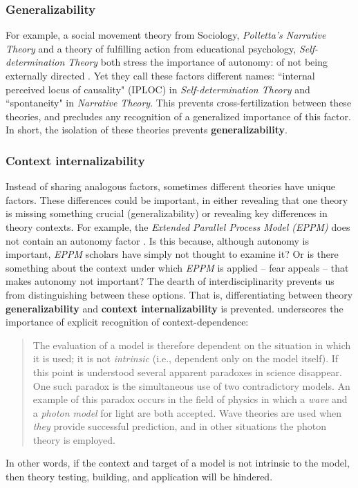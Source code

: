 \documentclass[12 pt]{article}
\begin{document}
 \subsubsection{Generalizability}
  For example, a social movement theory from Sociology, \textit{Polletta's Narrative Theory} and a theory of fulfilling action from educational psychology, \textit{Self-determination Theory} both stress the importance of autonomy: of not being externally directed \parencite{Polletta1998,Ryan2000,Ryan2000a}. Yet they call these factors different names: ``internal perceived locus of causality" (IPLOC) in \textit{Self-determination Theory} \parencite{Ryan2000,Ryan2000a} and ``spontaneity" in \textit{Narrative Theory}. This prevents cross-fertilization between these theories, and precludes any recognition of a generalized importance of this factor.  In short, the isolation of these theories prevents \textbf{generalizability}. 
 
 \subsubsection{Context internalizability} 
  Instead of sharing analogous factors, sometimes different theories have unique factors.  These differences could be important, in either revealing that one theory is missing something crucial (generalizability) or revealing key differences in theory contexts. For example, the \textit{Extended Parallel Process Model (EPPM)} does not contain an autonomy factor \parencite{Maloney2011}. Is this because, although autonomy is important, \textit{EPPM} scholars have simply not thought to examine it? Or is there something about the context under which \textit{EPPM} is applied -- fear appeals -- that makes autonomy not important? The dearth of interdisciplinarity prevents us from distinguishing between these options.  That is, differentiating between theory \textbf{generalizability} and \textbf{context internalizability} is prevented. 
  \textcite[][p. 172]{Bross1953} underscores the importance of explicit recognition of context-dependence: \blockquote{The evaluation of a model is therefore dependent on the situation in which it is used; it is not \textit{intrinsic} (i.e., dependent only on the model itself). If this point is understood several apparent paradoxes in science disappear. One such paradox is the simultaneous use of two contradictory models. An example of this paradox occurs in the field of physics in which a \textit{wave} and a \textit{photon model} for light are both accepted. Wave theories are used when \textit{they} provide successful prediction, and in other situations the photon theory is employed.}
  In other words, if the context and target of a model is not intrinsic to the model, then theory testing, building, and application will be hindered. 
  
\end{document}
